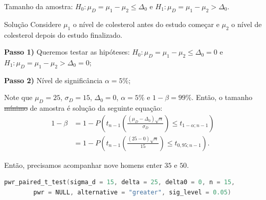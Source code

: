 \documentclass[9pt]{beamer}
\begin{document}
\begin{frame}[fragile]{Tamanho da amostra: $H_0:\mu_D = \mu_1 - \mu_2 \leq \Delta_0$ e $H_1:\mu_D =  \mu_1 - \mu_2 > \Delta_0$.}

\small
\begin{block}{Solução}
	Considere $\mu_1$ o nível de colesterol antes do estudo começar e $\mu_2$ o nível de colesterol depois do estudo finalizado.
	
	\textbf{Passo 1)} Queremos testar as hipóteses: $H_0: \mu_D = \mu_1 - \mu_2 \leq \Delta_0=0$ e $H_1:\mu_D = \mu_1 - \mu_2 > \Delta_0 = 0$;
	
	\textbf{Passo 2)} Nível de significância $\alpha=5\%$;
	
	Note que $\mu_D = 25$, $\sigma_D = 15$, $\Delta_0 = 0$, $\alpha=5\%$ e $1-\beta = 99\%$. Então, o tamanho \sout{mínimo} de amostra é solução da seguinte equação:
	\begin{align*}
	1-\beta &= 1 - P\left( t_{n-1}\left( \frac{(\mu_D - \Delta_0)\sqrt{n}}{\sigma_D} \right) \leq t_{1-\alpha;n-1} \right)\\
	&= 1 - P\left( t_{n-1}\left( \frac{(25 - 0)\sqrt{n}}{15} \right) \leq t_{0,95;n-1} \right).
	\end{align*}
	
	Então, precisamos acompanhar nove homens enter $35$ e $50$.
\end{block}

\begin{lstlisting}[language = C, caption = Código no R.]
pwr_paired_t_test(sigma_d = 15, delta = 25, delta0 = 0, n = 15,
		pwr = NULL, alternative = "greater", sig_level = 0.05)
\end{lstlisting}

\normalsize
\end{frame}
\end{document}
